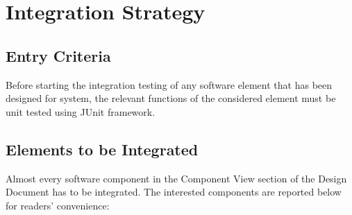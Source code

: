 \section{Integration Strategy}

\subsection{Entry Criteria}
Before starting the integration testing of any software element that has been designed for \myTaxiService{} system, the relevant functions of the considered element must be unit tested using JUnit framework.

\subsection{Elements to be Integrated}
Almost every software component in the Component View section of the Design Document has to be integrated.
The interested components are reported below for readers' convenience:
